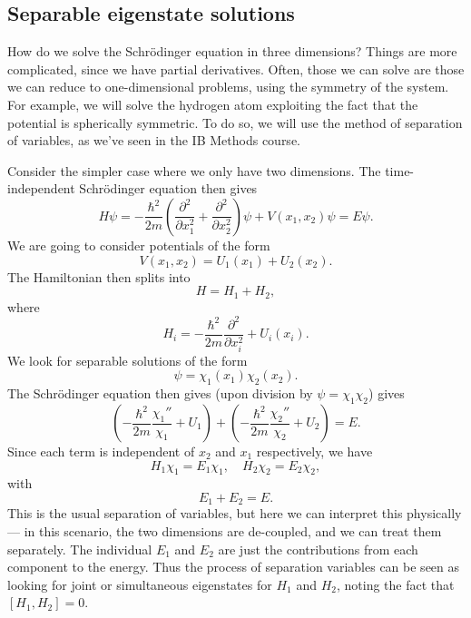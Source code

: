 \documentclass[a4paper]{article}
\begin{document}
\subsection{Separable eigenstate solutions}
How do we solve the Schr\"odinger equation in three dimensions? Things are more complicated, since we have partial derivatives. Often, those we can solve are those we can reduce to one-dimensional problems, using the symmetry of the system. For example, we will solve the hydrogen atom exploiting the fact that the potential is spherically symmetric. To do so, we will use the method of separation of variables, as we've seen in the IB Methods course.

Consider the simpler case where we only have two dimensions. The time-independent Schr\"odinger equation then gives
\[
  H\psi = -\frac{\hbar^2}{2m} \left(\frac{\partial^2}{\partial x_1^2} + \frac{\partial^2}{\partial x_2^2}\right)\psi + V(x_1, x_2)\psi = E\psi.
\]
We are going to consider potentials of the form
\[
  V(x_1, x_2) = U_1(x_1) + U_2(x_2).
\]
The Hamiltonian then splits into
\[
  H = H_1 + H_2,
\]
where
\[
  H_i = -\frac{\hbar^2}{2m} \frac{\partial^2}{\partial x_i^2} + U_i(x_i).
\]
We look for separable solutions of the form
\[
  \psi = \chi_1(x_1) \chi_2(x_2).
\]
The Schr\"odinger equation then gives (upon division by $\psi = \chi_1\chi_2$) gives
\[
  \left(-\frac{\hbar^2}{2m}\frac{\chi_1''}{\chi_1} + U_1\right) + \left(-\frac{\hbar^2}{2m}\frac{\chi_2''}{\chi_2} + U_2\right) = E.
\]
Since each term is independent of $x_2$ and $x_1$ respectively, we have
\[
  H_1 \chi_1 = E_1 \chi_1, \quad H_2 \chi_2 = E_2 \chi_2,
\]
with
\[
  E_1 + E_2 = E.
\]
This is the usual separation of variables, but here we can interpret this physically --- in this scenario, the two dimensions are de-coupled, and we can treat them separately. The individual $E_1$ and $E_2$ are just the contributions from each component to the energy. Thus the process of separation variables can be seen as looking for joint or simultaneous eigenstates for $H_1$ and $H_2$, noting the fact that $[H_1, H_2] = 0$.
\end{document}
